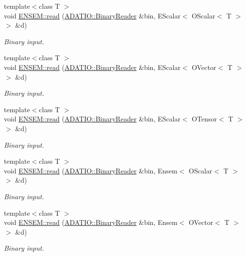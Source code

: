 \begin{DoxyCompactItemize}
{\footnotesize template$<$class T $>$ }\\void \mbox{\hyperlink{namespaceENSEM_ac9e6dd1b65ee654fcdc9d028ba4f1254}{E\+N\+S\+E\+M\+::read}} (\mbox{\hyperlink{classADATIO_1_1BinaryReader}{A\+D\+A\+T\+I\+O\+::\+Binary\+Reader}} \&bin, E\+Scalar$<$ O\+Scalar$<$ T $>$ $>$ \&d)
\begin{DoxyCompactList}\small\item\em Binary input. \end{DoxyCompactList}\item 
{\footnotesize template$<$class T $>$ }\\void \mbox{\hyperlink{namespaceENSEM_a263669f863c2a53acb71cfc540a21e0f}{E\+N\+S\+E\+M\+::read}} (\mbox{\hyperlink{classADATIO_1_1BinaryReader}{A\+D\+A\+T\+I\+O\+::\+Binary\+Reader}} \&bin, E\+Scalar$<$ O\+Vector$<$ T $>$ $>$ \&d)
\begin{DoxyCompactList}\small\item\em Binary input. \end{DoxyCompactList}\item 
{\footnotesize template$<$class T $>$ }\\void \mbox{\hyperlink{namespaceENSEM_afa38ef41983bd01a166feaa53c5b420d}{E\+N\+S\+E\+M\+::read}} (\mbox{\hyperlink{classADATIO_1_1BinaryReader}{A\+D\+A\+T\+I\+O\+::\+Binary\+Reader}} \&bin, E\+Scalar$<$ O\+Tensor$<$ T $>$ $>$ \&d)
\begin{DoxyCompactList}\small\item\em Binary input. \end{DoxyCompactList}\item 
{\footnotesize template$<$class T $>$ }\\void \mbox{\hyperlink{namespaceENSEM_a6dcfc9e12db208a46499969e1cc0088d}{E\+N\+S\+E\+M\+::read}} (\mbox{\hyperlink{classADATIO_1_1BinaryReader}{A\+D\+A\+T\+I\+O\+::\+Binary\+Reader}} \&bin, Ensem$<$ O\+Scalar$<$ T $>$ $>$ \&d)
\begin{DoxyCompactList}\small\item\em Binary input. \end{DoxyCompactList}\item 
{\footnotesize template$<$class T $>$ }\\void \mbox{\hyperlink{namespaceENSEM_aebc1e0b81049724d5c9a99befb160609}{E\+N\+S\+E\+M\+::read}} (\mbox{\hyperlink{classADATIO_1_1BinaryReader}{A\+D\+A\+T\+I\+O\+::\+Binary\+Reader}} \&bin, Ensem$<$ O\+Vector$<$ T $>$ $>$ \&d)
\begin{DoxyCompactList}\small\item\em Binary input. \end{DoxyCompactList}\item 

\end{DoxyCompactItemize}
